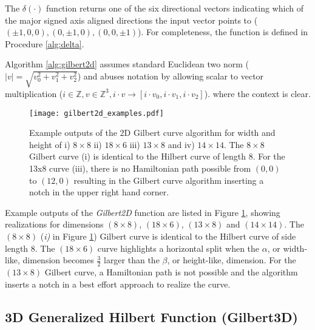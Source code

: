 The $\delta(\cdot)$ function returns one of the six directional vectors indicating which of
the major signed axis aligned directions the input vector points to ($(\pm1,0,0), (0,\pm1,0),(0,0,\pm1)$).
For completeness, the function is defined in Procedure \ref{alg:delta}.

Algorithm \ref{alg:gilbert2d} assumes standard Euclidean two norm ($|v| = \sqrt{v_0^2 + v_1^2 + v_2^2}$)
and abuses notation by allowing scalar to vector multiplication ($i \in \mathbb{Z}, v \in \mathbb{Z}^3, i \cdot v \to [ i \cdot v_0, i \cdot v_1, i \cdot v_2 ]$).
where the context is clear.

\begin{figure}[h]
  \centering
  \texttt{[image: gilbert2d\_examples.pdf]}
  \caption{ Example outputs of the 2D Gilbert curve algorithm for width and height of i) $8 \times 8$ ii) $18 \times 6$ iii) $13 \times 8$ and iv) $14 \times 14$.
            The $8 \times 8$ Gilbert curve (i) is identical to the Hilbert curve of length $8$.
            For the 13x8 curve (iii), there is no Hamiltonian path possible from $(0,0)$ to $(12,0)$ resulting in the Gilbert curve algorithm inserting a notch
            in the upper right hand corner. }
  \label{fig:gilbert2d_examples}
\end{figure}

Example outputs of the \textit{Gilbert2D} function are listed in Figure \ref{fig:gilbert2d_examples}, showing realizations for dimensions
$(8 \times 8)$, $(18 \times 6)$, $(13 \times 8)$ and $(14 \times 14)$.
The $(8 \times 8)$ (\textit{i)} in Figure \ref{fig:gilbert2d_examples}) Gilbert curve is identical to the Hilbert curve of side length 8.
The $(18 \times 6)$ curve highlights a horizontal split when the $\alpha$, or width-like, dimension becomes $\frac{3}{2}$ larger than the
$\beta$, or height-like, dimension.
For the $(13 \times 8)$ Gilbert curve, a Hamiltonian path is not possible and the algorithm inserts a notch in a best effort approach to realize the curve.


\subsection{3D Generalized Hilbert Function (Gilbert3D)}


